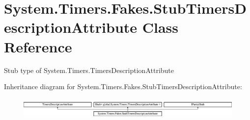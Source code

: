 \hypertarget{class_system_1_1_timers_1_1_fakes_1_1_stub_timers_description_attribute}{\section{System.\-Timers.\-Fakes.\-Stub\-Timers\-Description\-Attribute Class Reference}
\label{class_system_1_1_timers_1_1_fakes_1_1_stub_timers_description_attribute}
}


Stub type of System.\-Timers.\-Timers\-Description\-Attribute 


Inheritance diagram for System.\-Timers.\-Fakes.\-Stub\-Timers\-Description\-Attribute\-:\begin{figure}[H]
\begin{center}
\leavevmode
\includegraphics[height=1.088435cm]{class_system_1_1_timers_1_1_fakes_1_1_stub_timers_description_attribute}
\end{center}
\end{figure}
